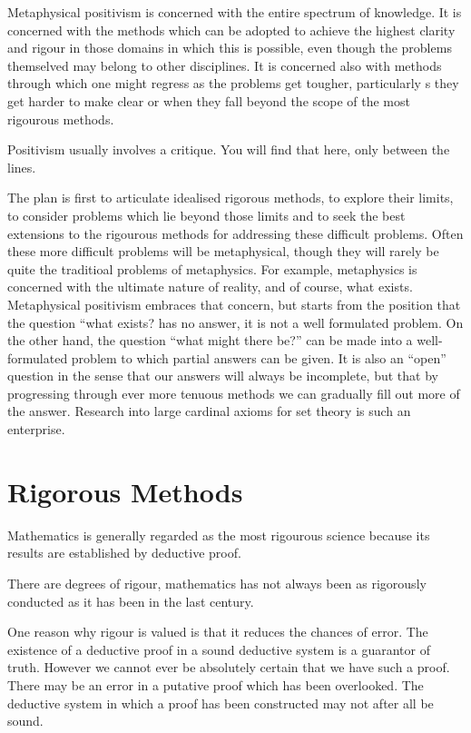 \documentclass{rbjk}
\begin{document}
\begin{article}
Metaphysical positivism is concerned with the entire spectrum of knowledge.
It is concerned with the methods which can be adopted to achieve the highest clarity and rigour in those domains in which this is possible, even though the problems themselved may belong to other disciplines.
It is concerned also with methods through which one might regress as the problems get tougher, particularly s they get harder to make clear or when they fall beyond the scope of the most rigourous methods.

Positivism usually involves a critique.
You will find that here, only between the lines.

The plan is first to articulate idealised rigorous methods, to explore their limits, to consider problems which lie beyond those limits and to seek the best extensions to the rigourous methods for addressing these difficult problems.
Often these more difficult problems will be metaphysical, though they will rarely be quite the traditioal problems of metaphysics.
For example, metaphysics is concerned with the ultimate nature of reality, and of course, what exists.
Metaphysical positivism embraces that concern, but starts from the position that the question ``what exists? has no answer, it is not a well formulated problem.
On the other hand, the question ``what might there be?'' can be made into a well-formulated problem to which partial answers can be given.
It is also an ``open'' question in the sense that our answers will always be incomplete, but that by progressing through ever more tenuous methods we can gradually fill out more of the answer.
Research into large cardinal axioms for set theory is such an enterprise.

\section{Rigorous Methods}

Mathematics is generally regarded as the most rigourous science because its results are established by deductive proof.

There are degrees of rigour, mathematics has not always been as rigorously conducted as it has been in the last century.

One reason why rigour is valued is that it reduces the chances of error.
The existence of a deductive proof in a sound deductive system is a guarantor of truth.
However we cannot ever be absolutely certain that we have such a proof.
There may be an error in a putative proof which has been overlooked.
The deductive system in which a proof has been constructed may not after all be sound.


\end{article}
\end{document}
